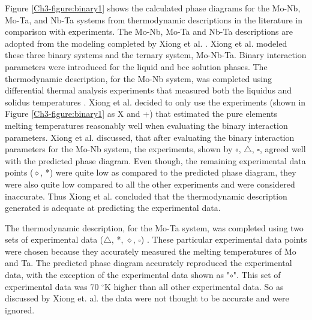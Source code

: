 Figure \ref{Ch3-figure:binary1} shows the calculated phase diagrams for the Mo-Nb, Mo-Ta, and Nb-Ta systems from thermodynamic descriptions in the literature in comparison with experiments. The Mo-Nb, Mo-Ta and Nb-Ta descriptions are adopted from the modeling completed by Xiong et al. \cite{Xiong2004}. Xiong et al. \cite{Xiong2004} modeled these three binary systems and the ternary system, Mo-Nb-Ta. Binary interaction parameters were introduced for the liquid and bcc solution phases. The thermodynamic description, for the Mo-Nb system, was completed using differential thermal analysis experiments that measured both the liquidus and solidus temperatures \cite{Xiong2004}. Xiong et al. \cite{Xiong2004} decided to only use the experiments (shown in Figure \ref{Ch3-figure:binary1} as X and +) that estimated the pure elements melting temperatures reasonably well when evaluating the binary interaction parameters. Xiong et al. \cite{Xiong2004} discussed, that after evaluating the binary interaction parameters for the Mo-Nb system, the experiments, shown by $\circ$, $\bigtriangleup$, $\square$, agreed well with the predicted phase diagram. Even though, the remaining experimental data points ($\diamond$, *) were quite low as compared to the predicted phase diagram, they were also quite low compared to all the other experiments \cite{Xiong2004} and were considered inaccurate. Thus Xiong et al. \cite{Xiong2004} concluded that the thermodynamic description generated is adequate at predicting the experimental data. 

The thermodynamic description, for the Mo-Ta system, was completed using two sets of experimental data ($\bigtriangleup$, *, $\diamond$, $\square$) \cite{Xiong2004}. These particular experimental data points were chosen because they accurately measured the melting temperatures of Mo and Ta. The predicted phase diagram accurately reproduced the experimental data, with the exception of the experimental data \cite{Xiong2004} shown as "$\circ$". This set of experimental data was 70 $^{\circ}$K higher than all other experimental data. So as discussed by Xiong et. al. \cite{Xiong2004} the data were not thought to be accurate and were ignored. 

